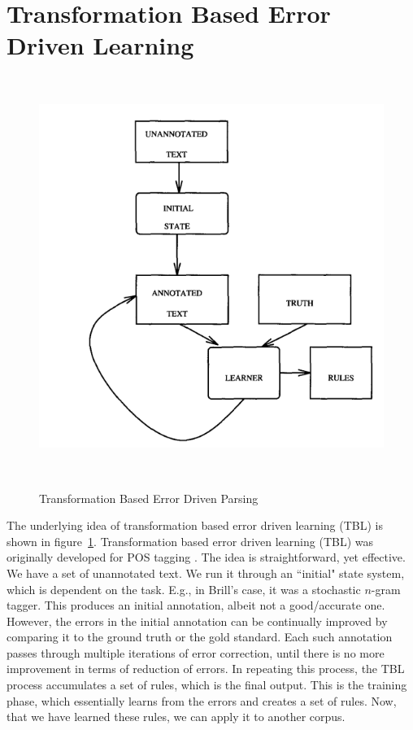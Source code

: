 \section{Transformation Based Error Driven Learning}~\label{sec:TBL}

\begin{figure}[t]
\centering
    \includegraphics[scale=0.8]{figures/tbl-brill.png}
\caption{Transformation Based Error Driven Parsing}~\citep{brill1992simple}
\label{tbl:brill}
\end{figure}

The underlying idea of transformation based error driven learning (TBL) is shown in figure~\ref{tbl:brill}. Transformation based error driven learning (TBL) was originally developed for POS tagging \cite{brill1992simple,Brill:1995:TEL:218355.218367}. The idea is straightforward, yet effective. We have a set of unannotated text. We run it through an ``initial" state system, which is dependent on the task. E.g., in Brill's case, it was a stochastic $n$-gram tagger. This produces an initial annotation, albeit not a good/accurate one. However, the errors in the initial annotation can be continually improved by comparing it to the ground truth or the gold standard. Each such annotation passes through multiple iterations of error correction, until there is no more improvement in terms of reduction of errors. In repeating this process, the TBL process accumulates a set of rules, which is the final output. This is the training phase, which essentially learns from the errors and creates a set of rules. Now, that we have learned these rules, we can apply it to another corpus. 

